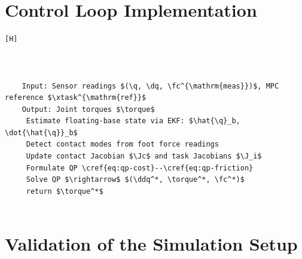 \begin{criticalinsight}
\end{criticalinsight}

\section{Control Loop Implementation}



\begin{verbatim}[H]
  
  
  
    Input: Sensor readings $(\q, \dq, \fc^{\mathrm{meas}})$, MPC reference $\xtask^{\mathrm{ref}}$
    Output: Joint torques $\torque$
     Estimate floating-base state via EKF: $\hat{\q}_b, \dot{\hat{\q}}_b$
     Detect contact modes from foot force readings
     Update contact Jacobian $\Jc$ and task Jacobians $\J_i$
     Formulate QP \cref{eq:qp-cost}--\cref{eq:qp-friction}
     Solve QP $\rightarrow$ $(\ddq^*, \torque^*, \fc^*)$
     return $\torque^*$
  
\end{verbatim}

\lipsum[29]

\section{Validation of the Simulation Setup}



\lipsum[30]

\begin{criticalinsight}
\end{criticalinsight}
